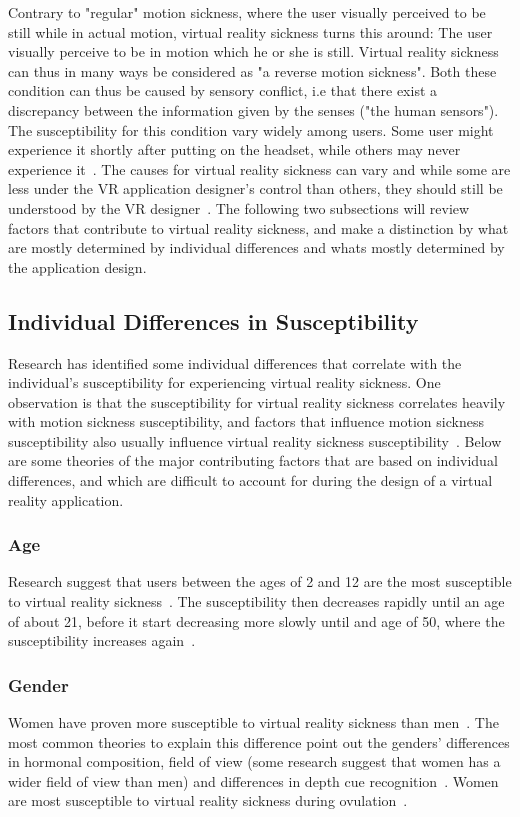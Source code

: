 Contrary to "regular" motion sickness, where the user visually perceived to be still while in actual motion, 
virtual reality sickness turns this around: The user visually perceive to be in motion which he or she is still. 
Virtual reality sickness can thus in many ways be considered as "a reverse motion sickness". Both these condition can thus be caused by
sensory conflict, i.e that there exist a discrepancy between the information given by the senses ("the human sensors").
The susceptibility for this condition vary widely among users. Some user might experience it shortly after putting on the headset, 
while others may never experience it~\citep{Stanney2003}.
The causes for virtual reality sickness can vary and while some are less under the VR application designer's control than others, 
they should still be understood by the VR designer~\citep{Stanney2003}. 
The following two subsections will review factors that contribute to virtual reality sickness, and make a distinction by
what are mostly determined by individual differences and whats mostly determined by the application design. 

\subsection{Individual Differences in Susceptibility}
Research has identified some individual differences that correlate with the individual's susceptibility for experiencing virtual reality sickness. 
One observation is that the susceptibility for virtual reality sickness correlates heavily with motion sickness susceptibility, and 
factors that influence motion sickness susceptibility also usually influence virtual reality sickness susceptibility~\citep{Stanney2003}.
Below are some theories of the major contributing factors that are based on individual differences, and which are difficult to account for during the design of a virtual reality application.

\subsubsection{Age}
Research suggest that users between the ages of 2 and 12 are the most susceptible to virtual reality sickness~\citep{Kolasinski1995}. The susceptibility then decreases
rapidly until an age of about 21, before it start decreasing more slowly until and age of 50, where the susceptibility increases again~\citep{Brooks2010}.

\subsubsection{Gender}
Women have proven more susceptible to virtual reality sickness than men~\citep{Kennedy1985}. The most common theories to explain this difference point out the genders' differences
in hormonal composition, field of view (some research suggest that women has a wider field of view than men) and differences in depth cue recognition~\citep{Biomed2012}. 
Women are most susceptible to virtual reality sickness during ovulation~\citep{Clemes2005}.

